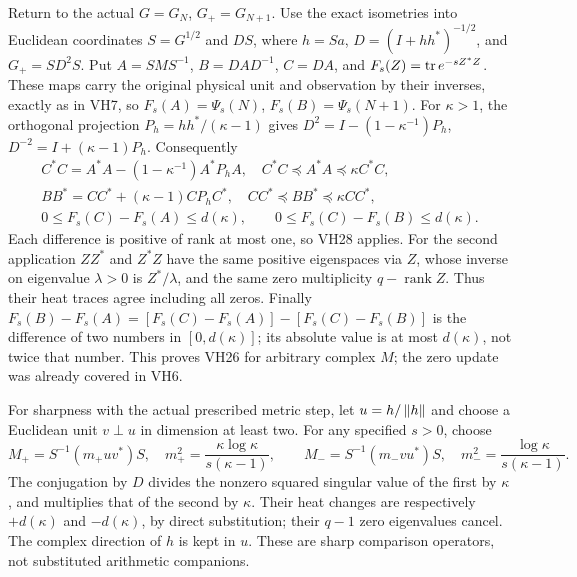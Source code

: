 Return to the actual \(G=G_N\), \(G_+=G_{N+1}\). Use the exact
isometries into Euclidean coordinates
\(S=G^{1/2}\) and \(DS\), where
\(h=Sa\), \(D=(I+hh^*)^{-1/2}\), and
\(G_+=S D^2 S\). Put \(A=SMS^{-1}\), \(B=DAD^{-1}\), \(C=DA\),
and \(F_s(Z)=\operatorname{tr} e^{-sZ^*Z}\). These maps carry the original physical
unit and observation by their inverses, exactly as in VH7, so
\(F_s(A)=\Psi_s(N)\), \(F_s(B)=\Psi_s(N+1)\).
For \(\kappa>1\), the orthogonal projection
\(P_h=hh^*/(\kappa-1)\) gives
\(D^2=I-(1-\kappa^{-1})P_h\), \(D^{-2}=I+(\kappa-1)P_h\).
Consequently
\begin{equation}\tag{VH29}\label{hvh:VH29}
\begin{gathered}
C^*C=A^*A-(1-\kappa^{-1})A^*P_hA,\quad
C^*C\preceq A^*A\preceq\kappa C^*C,\\
BB^*=CC^*+(\kappa-1)CP_hC^*,\quad
CC^*\preceq BB^*\preceq\kappa CC^*,\\
0\le F_s(C)-F_s(A)\le d(\kappa),\qquad
0\le F_s(C)-F_s(B)\le d(\kappa).
\end{gathered}
\end{equation}
Each difference is positive of rank at most one, so VH28 applies.
For the second application \(ZZ^*\) and \(Z^*Z\) have the same
positive eigenspaces via \(Z\), whose inverse on eigenvalue \(\lambda>0\)
is \(Z^*/\lambda\), and the same zero multiplicity \(q-\operatorname{rank}Z\).
Thus their heat traces agree including all zeros. Finally
\(F_s(B)-F_s(A)=[F_s(C)-F_s(A)]-[F_s(C)-F_s(B)]\) is the difference
of two numbers in \([0,d(\kappa)]\); its absolute value is at most
\(d(\kappa)\), not twice that number. This proves VH26 for arbitrary
complex \(M\); the zero update was already covered in VH6.

For sharpness with the actual prescribed metric step, let \(u=h/\left\lVert h\right\rVert\)
and choose a Euclidean unit \(v\perp u\) in dimension at least two.
For any specified \(s>0\), choose
\begin{equation}\tag{VH30}\label{hvh:VH30}
M_+=S^{-1}(m_+uv^*)S,\quad
m_+^2=\frac{\kappa\log\kappa}{s(\kappa-1)},\qquad
M_-=S^{-1}(m_-vu^*)S,\quad
m_-^2=\frac{\log\kappa}{s(\kappa-1)}.
\end{equation}
The conjugation by \(D\) divides the nonzero squared singular value
of the first by \(\kappa\), and multiplies that of the second by
\(\kappa\). Their heat changes are respectively
\(+d(\kappa)\) and \(-d(\kappa)\), by direct substitution; their
\(q-1\) zero eigenvalues cancel. The complex direction of \(h\) is
kept in \(u\). These are sharp comparison operators, not substituted
arithmetic companions.

